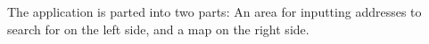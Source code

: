 The application is parted into two parts: An area for inputting addresses to search for on the left side, and a map on the right side. 